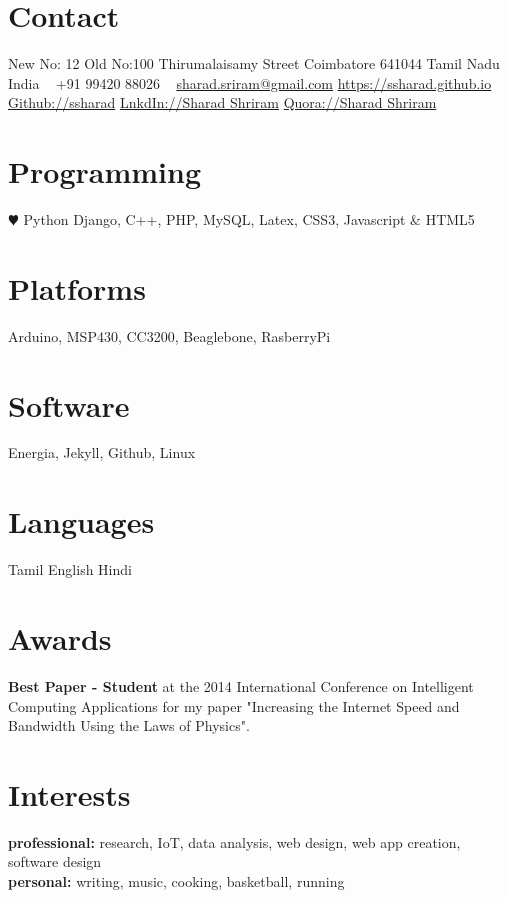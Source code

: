 \documentclass[]{friggeri-cv} %
\begin{document}


\begin{aside} %
\section{Contact}
New No: 12 Old No:100
Thirumalaisamy Street
Coimbatore 641044
Tamil Nadu
India
~
+91 99420 88026
~
\href{mailto:sharad.sriram@gmail.com}{sharad.sriram@gmail.com}
\href{https://ssharad.github.io}{https://ssharad.github.io}
\href{https://github.com/ssharad}{Github://ssharad}
\href{https://in.linkedin.com/in/sharad10694}{LnkdIn://Sharad Shriram}
\href{https://www.quora.com/profile/Sharad-Shriram}{Quora://Sharad Shriram}
\section{Programming}
{\color{red} $\varheartsuit$} Python
Django, C++, PHP,
MySQL, Latex, CSS3,
Javascript \& HTML5
\section{Platforms}
Arduino, MSP430, CC3200,
Beaglebone, RasberryPi
\section{Software}
Energia, Jekyll, Github, Linux
\section{Languages}
Tamil 
English 
Hindi 
\section{Awards}
\textbf{Best Paper - Student} at the 2014 International Conference on Intelligent Computing Applications for my paper "Increasing the Internet Speed and Bandwidth Using the Laws of Physics".
\section{Interests}
\textbf{professional:} research, IoT, data analysis, web design, web app creation, software design\\ \textbf{personal:} writing, music, cooking, basketball, running
\end{aside}
\end{document}
